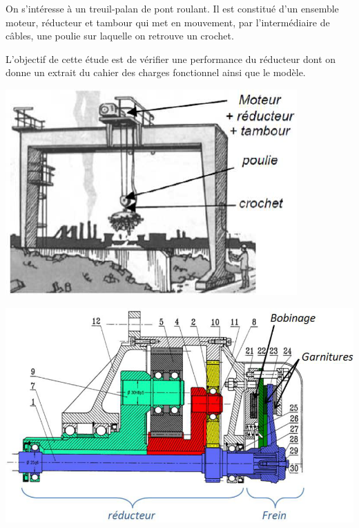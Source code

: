 \documentclass[10pt,fleqn]{article} %
\begin{document}
\begin{minipage}[c]{.45\linewidth}
On s'intéresse à un treuil-palan de pont roulant. Il est constitué d'un ensemble moteur, réducteur et tambour qui met en mouvement, par l'intermédiaire de câbles, une poulie sur laquelle on retrouve un crochet.

L'objectif de cette étude est de vérifier une performance du réducteur dont on donne un extrait du cahier des charges fonctionnel ainsi que le modèle. 
\end{minipage}\hfill
\begin{minipage}[c]{.45\linewidth}
\begin{center}
\includegraphics[width=.9\textwidth]{images/train_01}
\end{center}
\end{minipage}

\vspace{.5cm}

\begin{center}
\includegraphics[width=.7\textwidth]{images/train_05}
\end{center}
\end{document}
